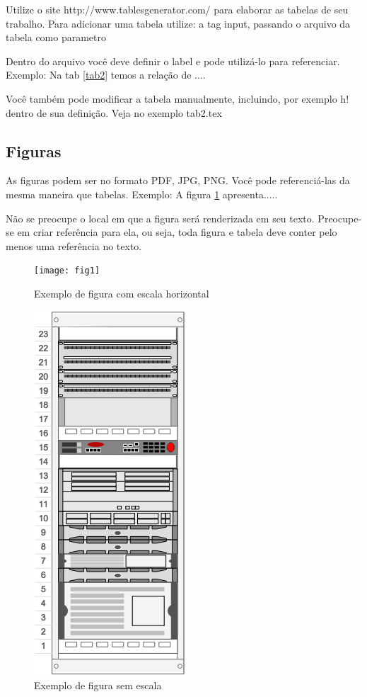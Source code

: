\documentclass[	DIV=calc,%
							paper=a4,%
							fontsize=12pt,%
							onecolumn]{scrartcl}	 					%
\begin{document}
Utilize o site http://www.tablesgenerator.com/ para elaborar as tabelas de seu trabalho.
Para adicionar uma tabela utilize: a tag input, passando o arquivo da tabela como parametro



Dentro do arquivo você deve definir o label e pode utilizá-lo para referenciar. Exemplo:
Na tab \ref{tab2} temos a relação de ....


Você também pode modificar a tabela manualmente, incluindo, por exemplo h! dentro de sua definição. Veja no exemplo tab2.tex

\subsection{Figuras}

As figuras podem ser no formato PDF, JPG, PNG. Você pode referenciá-las da mesma maneira que tabelas. Exemplo: A figura \ref{fig1} apresenta.....

Não se preocupe o local em que a figura será renderizada em seu texto. Preocupe-se em criar referência para ela, ou seja, toda figura e tabela deve conter pelo menos uma referência no texto.

\begin{figure}
\centering
\texttt{[image: fig1]}
\caption{Exemplo de figura com escala horizontal}
\label{fig1}
\end{figure}


\begin{figure}
	\centering
	\includegraphics[]{fig2}
	\caption{Exemplo de figura sem escala}
	\label{fig2}
\end{figure}
\end{document}
